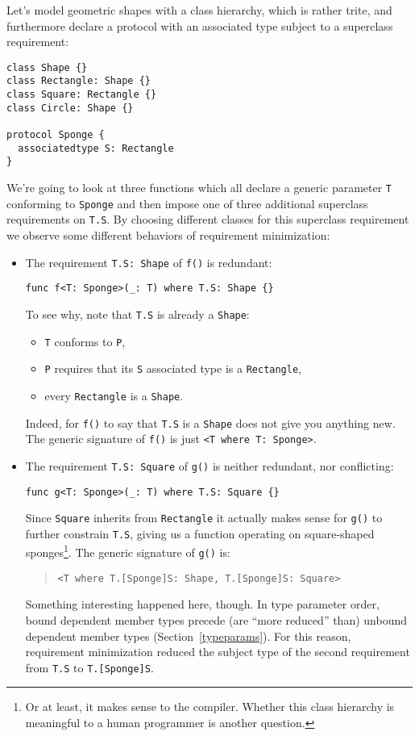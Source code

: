 \documentclass[../generics]{subfiles}
\begin{document}
\begin{example} Let's model geometric shapes with a class hierarchy, which is rather trite, and furthermore declare a protocol with an associated type subject to a superclass requirement:
\begin{Verbatim}
class Shape {}
class Rectangle: Shape {}
class Square: Rectangle {}
class Circle: Shape {}

protocol Sponge {
  associatedtype S: Rectangle
}
\end{Verbatim}
We're going to look at three functions which all declare a generic parameter \texttt{T} conforming to \texttt{Sponge} and then impose one of three additional superclass requirements on \texttt{T.S}. By choosing different classes for this superclass requirement we observe some different behaviors of requirement minimization:
\begin{itemize}
\item The requirement \verb|T.S: Shape| of \texttt{f()} is redundant:
\begin{Verbatim}
func f<T: Sponge>(_: T) where T.S: Shape {}
\end{Verbatim}
To see why, note that \texttt{T.S} is already a \texttt{Shape}:
\begin{itemize}
\item \texttt{T} conforms to \texttt{P},
\item \texttt{P} requires that its \texttt{S} associated type is a \texttt{Rectangle},
\item every \texttt{Rectangle} is a \texttt{Shape}.
\end{itemize}
Indeed, for \texttt{f()} to say that \texttt{T.S} is a \texttt{Shape} does not give you anything new. The generic signature of \texttt{f()} is just \verb|<T where T: Sponge>|.

\item The requirement \verb|T.S: Square| of \texttt{g()} is neither redundant, nor conflicting:
\begin{Verbatim}
func g<T: Sponge>(_: T) where T.S: Square {}
\end{Verbatim}
Since \texttt{Square} inherits from \texttt{Rectangle} it actually makes sense for \texttt{g()} to further constrain \texttt{T.S}, giving us a function operating on square-shaped sponges\footnote{Or at least, it makes sense to the compiler. Whether this class hierarchy is meaningful to a human programmer is another question.}. The generic signature of \texttt{g()} is:
\begin{quote}
\begin{verbatim}
<T where T.[Sponge]S: Shape, T.[Sponge]S: Square>
\end{verbatim}
\end{quote}
Something interesting happened here, though. In type parameter order, bound dependent member types precede (are ``more reduced'' than) unbound dependent member types (Section~\ref{typeparams}). For this reason, requirement minimization reduced the subject type of the second requirement from \texttt{T.S} to \texttt{T.[Sponge]S}.


\end{itemize}
\end{example}
\end{document}
